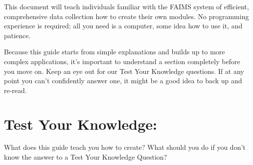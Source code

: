 This document will teach individuals familiar with the FAIMS system of efficient, comprehensive data collection how to create their own modules. No programming experience is required; all you need is a computer, some idea how to use it, and patience.

Because this guide starts from simple explanations and builds up to more complex applications, it's important to understand a section completely before you move on. Keep an eye out for our Test Your Knowledge questions. If at any point you can't confidently answer one, it might be a good idea to back up and re-read.

\section{Test Your Knowledge:}
\startitemize
\item What does this guide teach you how to create?
\itme What should you do if you don't know the answer to a Test Your Knowledge Question?
\stopitemize